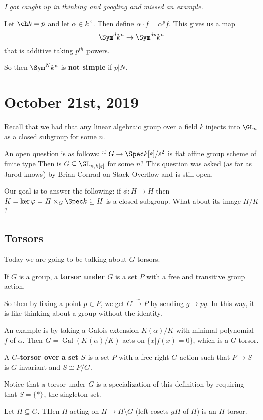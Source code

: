 \documentclass[12pt]{article}
\begin{document}
\textit{I got caught up in thinking and googling and missed an example.}

Let $\ch k=p$ and let $\alpha\in k^\times$. Then define $\alpha\cdot f=\alpha^pf$. This gives us a map 
\[\Sym^d k^n\to \Sym^{dp}k^n\]
that is additive taking $p^{th}$ powers.

So then $\Sym^N k^n$ is \textbf{not simple} if $p|N$.

\section{October 21st, 2019}
Recall that we had that any linear algebraic group over a field $k$ injects into $\GL_n$ as a closed subgroup for some $n$.

An open question is as follows: if $G\to\Spec k[\varepsilon]/\varepsilon^2$ is flat affine group scheme of finite type
Then is $G\subseteq\GL_{n,k[\varepsilon]}$ for some $n?$ This question was asked (as far as Jarod knows) by Brian Conrad on Stack Overflow 
and is still open.

Our goal is to answer the following: if $\phi:H\to H$ then $K=\ker\varphi=H\times_G\Spec k\subseteq H$ is a closed subgroup. What about its image $H/K$?

\subsection{Torsors}
Today we are going to be talking about $G$-torsors.
\begin{defn}
	If $G$ is a group, a \textbf{torsor under $G$} is a set $P$ with a free and transitive group action.
\end{defn}
\begin{rmk}
	So then by fixing a point $p\in P$, we get $G\xrightarrow{\sim}P$ by sending $g\mapsto pg$. In this way, it is like thinking about 
	a group without the identity.
\end{rmk}
An example is by taking a Galois extension $K(\alpha)/K$ with minimal polynomial $f$ of $\alpha$. Then $G=\operatorname{Gal}(K(\alpha)/K)$ acts on 
$\{x|f(x)=0\}$, which is a $G$-torsor.
\begin{defn}
	A \textbf{$G$-torsor over a set $S$} is a set $P$ with a free right $G$-action such that $P\to S$ is $G$-invariant and $S\cong P/G$.
\end{defn}
\begin{rmk}
	Notice that a torsor under $G$ is a specialization of this definition by requiring that $S=\{\ast\}$, the singleton set.
\end{rmk}
\begin{ex}
	Let $H\subseteq G$. THen $H$ acting on $H\to H\setminus G$ (left cosets $gH$ of $H$) is an $H$-torsor.
\end{ex}
\end{document}
